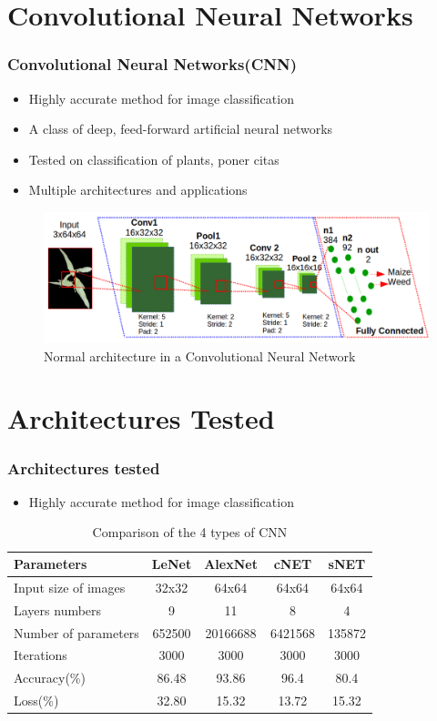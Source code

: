 \documentclass[10pt,a4paper]{beamer}
\begin{document}
\section{Convolutional Neural Networks}
\begin{frame}
\frametitle{Convolutional Neural Networks(CNN)}
\begin{itemize}
	\item Highly accurate method for image classification
	\item A class of deep, feed-forward artificial neural networks
	\item Tested on classification of plants, poner citas
	\item Multiple architectures and applications
\end{itemize}
	\begin{figure}[h]
	\centering
	\includegraphics[width=3.5 in]{arquitectura}
	\caption{Normal architecture in a Convolutional Neural Network}
	\label{figure4}
	\end{figure}
\end{frame}
\section{Architectures Tested}
\begin{frame}
\frametitle{Architectures tested}
\begin{itemize}
	\item Highly accurate method for image classification
\end{itemize}
\begin{table}[h!]
\centering
\renewcommand{\arraystretch}{1.2}
\caption{Comparison of the 4 types of CNN}
\label{table:2}
\begin{tabular}{|l c c c c|} 
 \hline
 \textbf{Parameters }& \textbf{LeNet} & \textbf{AlexNet} & \textbf{cNET} & \textbf{sNET} \\ [0.75ex] 
 \hline
 Input size of images & 32x32 & 64x64 & 64x64 & 64x64 \\ 
 Layers numbers & 9 & 11 & 8 & 4\\
 Number of parameters & 652500 & 20166688 & 6421568 & 135872 \\ 
 Iterations & 3000 & 3000 & 3000 & 3000 \\ 
 Accuracy(\%) & 86.48 & 93.86 & 96.4 & 80.4 \\
 Loss(\%) & 32.80 & 15.32 & 13.72 & 15.32 \\ [1ex] 
 \hline 
\end{tabular}
\end{table}
\end{frame}
\end{document}
